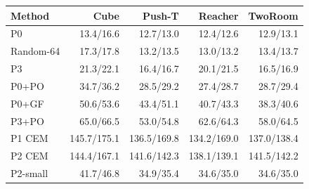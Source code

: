 \begin{tabular}{lrrrr}
\toprule
Method & Cube & Push-T & Reacher & TwoRoom \\
\midrule
P0 & 13.4/16.6 & 12.7/13.0 & 12.4/12.6 & 12.9/13.1 \\
Random-64 & 17.3/17.8 & 13.2/13.5 & 13.0/13.2 & 13.4/13.7 \\
P3 & 21.3/22.1 & 16.4/16.7 & 20.1/21.5 & 16.5/16.9 \\
P0+PO & 34.7/36.2 & 28.5/29.2 & 27.4/28.7 & 28.7/29.4 \\
P0+GF & 50.6/53.6 & 43.4/51.1 & 40.7/43.3 & 38.3/40.6 \\
P3+PO & 65.0/66.5 & 53.0/54.8 & 62.6/64.3 & 58.0/64.5 \\
P1 CEM & 145.7/175.1 & 136.5/169.8 & 134.2/169.0 & 137.0/138.4 \\
P2 CEM & 144.4/167.1 & 141.6/142.3 & 138.1/139.1 & 141.5/142.2 \\
P2-small & 41.7/46.8 & 34.9/35.4 & 34.6/35.0 & 34.6/35.0 \\
\bottomrule
\end{tabular}
